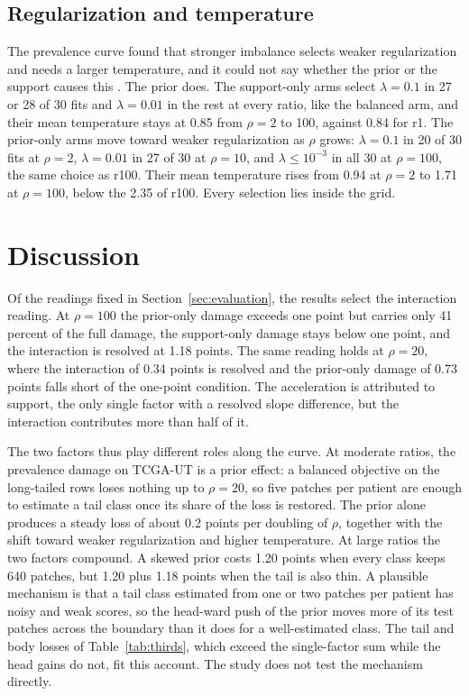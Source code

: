 \subsection{Regularization and temperature}
\label{sec:selection-results}
The prevalence curve found that stronger imbalance selects weaker regularization and needs a larger temperature, and it could not say whether the prior or the support causes this \citep{queisler2026prevalenceTcga}. The prior does. The support-only arms select $\lambda=0.1$ in 27 or 28 of 30 fits and $\lambda=0.01$ in the rest at every ratio, like the balanced arm, and their mean temperature stays at 0.85 from $\rho=2$ to 100, against 0.84 for r1. The prior-only arms move toward weaker regularization as $\rho$ grows: $\lambda=0.1$ in 20 of 30 fits at $\rho=2$, $\lambda=0.01$ in 27 of 30 at $\rho=10$, and $\lambda\leq10^{-3}$ in all 30 at $\rho=100$, the same choice as r100. Their mean temperature rises from 0.94 at $\rho=2$ to 1.71 at $\rho=100$, below the 2.35 of r100. Every selection lies inside the grid.

\section{Discussion}
\label{sec:discussion}
Of the readings fixed in Section~\ref{sec:evaluation}, the results select the interaction reading. At $\rho=100$ the prior-only damage exceeds one point but carries only 41 percent of the full damage, the support-only damage stays below one point, and the interaction is resolved at 1.18 points. The same reading holds at $\rho=20$, where the interaction of 0.34 points is resolved and the prior-only damage of 0.73 points falls short of the one-point condition. The acceleration is attributed to support, the only single factor with a resolved slope difference, but the interaction contributes more than half of it.

The two factors thus play different roles along the curve. At moderate ratios, the prevalence damage on TCGA-UT is a prior effect: a balanced objective on the long-tailed rows loses nothing up to $\rho=20$, so five patches per patient are enough to estimate a tail class once its share of the loss is restored. The prior alone produces a steady loss of about 0.2 points per doubling of $\rho$, together with the shift toward weaker regularization and higher temperature. At large ratios the two factors compound. A skewed prior costs 1.20 points when every class keeps 640 patches, but 1.20 plus 1.18 points when the tail is also thin. A plausible mechanism is that a tail class estimated from one or two patches per patient has noisy and weak scores, so the head-ward push of the prior moves more of its test patches across the boundary than it does for a well-estimated class. The tail and body losses of Table~\ref{tab:thirds}, which exceed the single-factor sum while the head gains do not, fit this account. The study does not test the mechanism directly.

